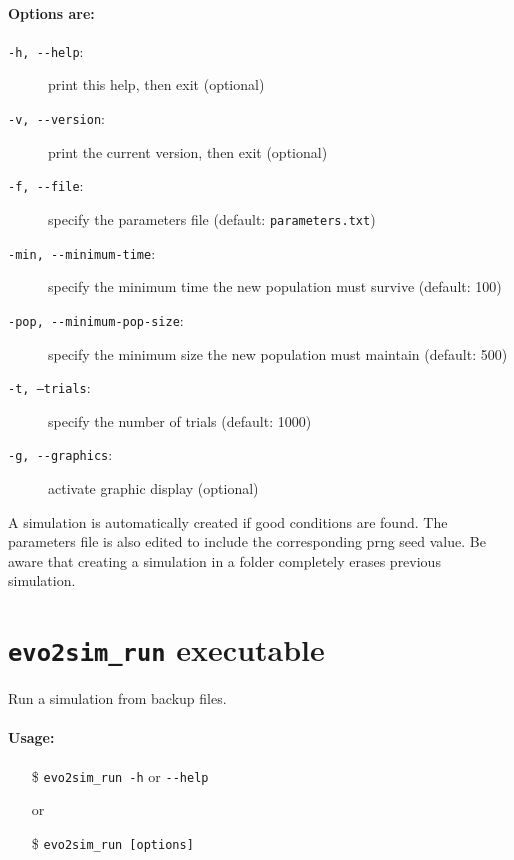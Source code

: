 \paragraph{Options are:}
\begin{description}
        \item[\texttt{-h, -{}-help}:] print this help, then exit (optional)
        \item[\texttt{-v, -{}-version}:] print the current version, then exit (optional)
        \item[\texttt{-f, -{}-file}:] specify the parameters file (default: \texttt{parameters.txt})
        \item[\texttt{-min, -{}-minimum-time}:] specify the minimum time the new population must survive (default: 100)
        \item[\texttt{-pop, -{}-minimum-pop-size}:] specify the minimum size the new population must maintain (default: 500)
        \item[\texttt{-t, --trials}:] specify the number of trials (default: 1000)
        \item[\texttt{-g, -{}-graphics}:]  activate graphic display (optional)
\end{description}
A simulation is automatically created if good conditions are found.
The parameters file is also edited to include the corresponding prng seed value.
Be aware that creating a simulation in a folder completely erases previous simulation.

\section{\texttt{evo2sim\_run} executable}
Run a simulation from backup files.
\paragraph{Usage:}
\begin{itemize}
        \item[\$] \texttt{evo2sim\_run -h} or \texttt{-{}-help}
        \item[or]
        \item[\$] \texttt{evo2sim\_run [options]}
\end{itemize}
